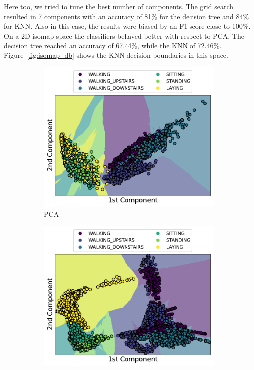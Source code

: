 \documentclass[10pt, a4paper, twocolumn]{article}
\begin{document}
Here too, we tried to tune the best number of components. The grid search resulted in 7 components with an accuracy of 81\% for the decision tree and 84\% for KNN. Also in this case, the results were biased by an F1 score close to 100\%. On a 2D isomap space the classifiers behaved better with respect to PCA. The decision tree reached an accuracy of 67.44\%, while the KNN of 72.46\%. Figure~\ref{fig:isomap_db} shows the KNN decision boundaries in this space. 

\begin{figure}[t]
    \centering
    \begin{subfigure}[t]{0.49\linewidth}
        \includegraphics[width=\linewidth]{immagini simone/PCA_KNN_decision_boundaries.pdf}
        \caption{PCA}
        \label{fig:pca_db}
    \end{subfigure}
    \hfill%
    \begin{subfigure}[t]{0.49\linewidth}
        \includegraphics[width=\linewidth]{immagini simone/KNN_decision_boundaries_isomap.pdf}

\end{subfigure}
\end{figure}
\end{document}
